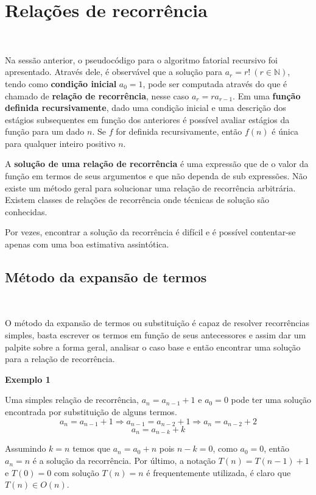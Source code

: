 \section{Relações de recorrência}
\

Na sessão anterior, o pseudocódigo para o algoritmo fatorial recursivo foi apresentado. Através dele, é observável que a solução para $a_r = r! \ (r \in \mathbb{N})$, tendo como \textbf{condição inicial} $a_0 = 1$, pode ser computada através do que é chamado de \textbf{relação de recorrência}, nesse caso $a_r = ra_{r-1}$. Em uma \textbf{função definida recursivamente}, dado uma condição inicial e uma descrição dos estágios subsequentes em função dos anteriores é possível avaliar estágios da função para um dado $n$. Se $f$ for definida recursivamente, então $f(n)$ é única para qualquer inteiro positivo $n$.

A \textbf{solução de uma relação de recorrência} é uma expressão que de o valor da função em termos de seus argumentos e que não dependa de sub expressões. Não existe um método geral para solucionar uma relação de recorrência arbitrária. Existem classes de relações de recorrência onde técnicas de solução são conhecidas.

Por vezes, encontrar a solução da recorrência é difícil e é possível contentar-se apenas com uma boa estimativa assintótica.

\subsection{Método da expansão de termos}
\

O método da expansão de termos ou substituição é capaz de resolver recorrências simples, basta escrever os termos em função de seus antecessores e assim dar um palpite sobre a forma geral, analisar o caso base e então encontrar uma solução para a relação de recorrência.

\textbf{Exemplo 1}

Uma simples relação de recorrência, $a_n = a_{n-1} + 1$ e $a_0=0$ pode ter uma solução encontrada por substituição de alguns termos.
\[a_n = a_{n-1} + 1 \Rightarrow a_{n-1} = a_{n-2} + 1 \Rightarrow a_n = a_{n-2} + 2\]
\[a_n = a_{n-k} + k\]

Assumindo $k=n$ temos que $a_n=a_0 + n$ pois $n-k = 0$, como $a_0=0$, então $a_n=n$ é a solução da recorrência. Por último, a notação $T(n)=T(n-1)+1$ e $T(0)=0$ com solução $T(n) = n$ é frequentemente utilizada, é claro que $T(n) \in O(n)$.

